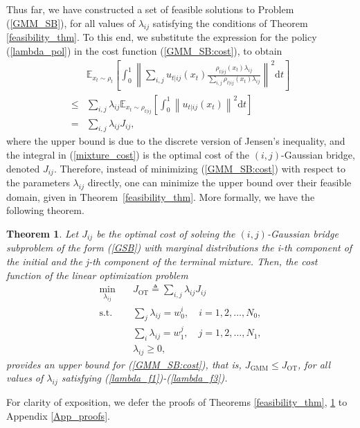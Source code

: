 \documentclass[twoside]{article}
\newtheorem{theorem}{Theorem}
\renewcommand{\eqref}[1]{(\ref{#1})}
\renewcommand{\E}{\mathbb{E}}
\renewcommand{\d}{\mathrm{d}}
\begin{document}
Thus far, we have constructed a set of feasible solutions to Problem \eqref{GMM_SB}, for all values of $\lambda_{ij}$ satisfying the conditions of Theorem \ref{feasibility_thm}.
To this end, we substitute the expression for the policy \eqref{lambda_pol} in the cost function \eqref{GMM_SB:cost}, to obtain
\begin{subequations}
    \begin{align}
         & \E_{x_t \sim \rho_t} \left[ \int_{0}^{1}{ \left\| \sum_{i,j} {u_{t|ij}(x_t) \frac{ \rho_{t|ij}(x_t)\lambda_{ij}}{\sum_{i,j} \rho_{t|ij}(x_t) \lambda_{ij}}} \right\|^2 \d t} \right] \nonumber \\
             \leq & \sum_{i,j} \lambda_{ij} \E_{x_t \sim \rho_{t|ij}} \left[
 \int_{0}^{1} { \left\|u_{t|ij}(x_t)\right\|^2}  \d t \right]  \label{mixture_cost} \\
        = & \sum_{i,j} \lambda_{ij} J_{ij} ,
    \end{align}
\end{subequations}
where the upper bound is due to the discrete version of Jensen's inequality, and the integral in \eqref{mixture_cost} is the optimal cost of the $(i,j)$-Gaussian bridge, denoted $J_{ij}$.
Therefore, instead of minimizing \eqref{GMM_SB:cost} with respect to the parameters $\lambda_{ij}$ directly, one can minimize the upper bound over their feasible domain, given 
in Theorem~\ref{feasibility_thm}.  
%
More formally, we have the following theorem.

\begin{theorem} \label{OT_thm}
Let $J_{ij}$ be the optimal cost of solving the $(i,j)$-Gaussian bridge subproblem of the form \eqref{GSB} with marginal distributions the i-th component of the initial and the j-th component of the terminal mixture.
Then, the cost function of the linear optimization problem
\begin{subequations}\label{fleet_OT}
\begin{align}
\min_{\lambda_{ij}} \quad & J_{\mathrm{OT}} \triangleq \sum_{i,j} \lambda_{ij} J_{ij} \label{OTcost} \\
\mathrm{s.t.} \quad & \sum_j \lambda_{ij} = w_0^i , \quad i = 1, 2, \dots, N_0, \label{lambda_f1}\\
& \sum_i \lambda_{ij}= w_1^j,  \quad j = 1, 2, \dots, N_1, \label{lambda_f2}\\
& \lambda_{ij} \geq 0 \label{lambda_f3},
\end{align}
\end{subequations}
provides an upper bound for \eqref{GMM_SB:cost}, that is, $J_{\mathrm{GMM}} \leq J_{\mathrm{OT}}$, for all values of $\lambda_{ij}$ satisfying \eqref{lambda_f1}-\eqref{lambda_f3}.
\end{theorem}
For clarity of exposition, we defer the proofs of Theorems \ref{feasibility_thm}, \ref{OT_thm} to Appendix \ref{App_proofs}.
\end{document}
